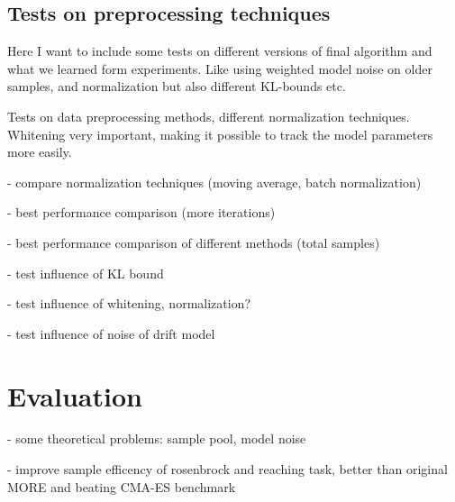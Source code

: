 
\subsection{Tests on preprocessing techniques}
Here I want to include some tests on different versions
of final algorithm and what we learned form experiments.
Like using weighted model noise on older samples, and
normalization but also different KL-bounds etc.


Tests on data preprocessing methods, different normalization techniques.
Whitening very important, making it possible to track the model parameters
more easily.

- compare normalization techniques (moving average, batch normalization)

- best performance comparison (more iterations)

- best performance comparison of different methods (total samples)

- test influence of KL bound

- test influence of whitening, normalization?

- test influence of noise of drift model

\section{Evaluation}
- some theoretical problems: sample pool, model noise

- improve sample efficency of rosenbrock and reaching task,
better than original MORE and beating CMA-ES benchmark

